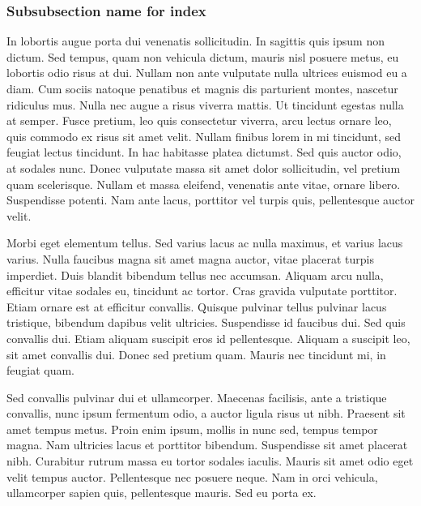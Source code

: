 \subsubsection[Subsubsection name]{Subsubsection name for index}
In lobortis augue porta dui venenatis sollicitudin. In sagittis quis ipsum non dictum. Sed tempus, quam non vehicula dictum, mauris nisl posuere metus, eu lobortis odio risus at dui. Nullam non ante vulputate nulla ultrices euismod eu a diam. Cum sociis natoque penatibus et magnis dis parturient montes, nascetur ridiculus mus. Nulla nec augue a risus viverra mattis. Ut tincidunt egestas nulla at semper. Fusce pretium, leo quis consectetur viverra, arcu lectus ornare leo, quis commodo ex risus sit amet velit. Nullam finibus lorem in mi tincidunt, sed feugiat lectus tincidunt. In hac habitasse platea dictumst. Sed quis auctor odio, at sodales nunc. Donec vulputate massa sit amet dolor sollicitudin, vel pretium quam scelerisque. Nullam et massa eleifend, venenatis ante vitae, ornare libero. Suspendisse potenti. Nam ante lacus, porttitor vel turpis quis, pellentesque auctor velit.

Morbi eget elementum tellus. Sed varius lacus ac nulla maximus, et varius lacus varius. Nulla faucibus magna sit amet magna auctor, vitae placerat turpis imperdiet. Duis blandit bibendum tellus nec accumsan. Aliquam arcu nulla, efficitur vitae sodales eu, tincidunt ac tortor. Cras gravida vulputate porttitor. Etiam ornare est at efficitur convallis. Quisque pulvinar tellus pulvinar lacus tristique, bibendum dapibus velit ultricies. Suspendisse id faucibus dui. Sed quis convallis dui. Etiam aliquam suscipit eros id pellentesque. Aliquam a suscipit leo, sit amet convallis dui. Donec sed pretium quam. Mauris nec tincidunt mi, in feugiat quam.

Sed convallis pulvinar dui et ullamcorper. Maecenas facilisis, ante a tristique convallis, nunc ipsum fermentum odio, a auctor ligula risus ut nibh. Praesent sit amet tempus metus. Proin enim ipsum, mollis in nunc sed, tempus tempor magna. Nam ultricies lacus et porttitor bibendum. Suspendisse sit amet placerat nibh. Curabitur rutrum massa eu tortor sodales iaculis. Mauris sit amet odio eget velit tempus auctor. Pellentesque nec posuere neque. Nam in orci vehicula, ullamcorper sapien quis, pellentesque mauris. Sed eu porta ex. 
